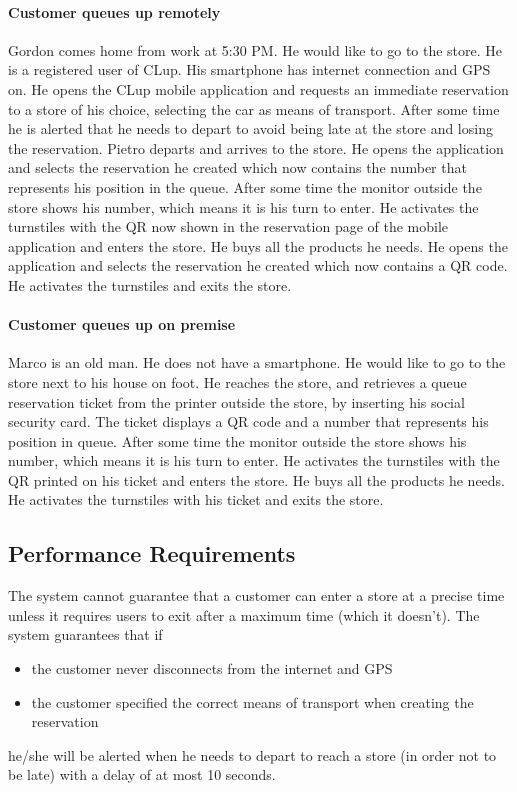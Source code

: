 \paragraph{Customer queues up remotely}
Gordon comes home from work at 5:30 PM. He would like to go to the store. He is a registered user of CLup. His smartphone has internet connection and GPS on. He opens the CLup mobile application and requests an immediate reservation to a store of his choice, selecting the car as means of transport. After some time he is alerted that he needs to depart to avoid being late at the store and losing the reservation. Pietro departs and arrives to the store. He opens the application and selects the reservation he created which now contains the number that represents his position in the queue. After some time the monitor outside the store shows his number, which means it is his turn to enter. He activates the turnstiles with the QR now shown in the reservation page of the mobile application and enters the store. He buys all the products he needs. He opens the application and selects the reservation he created which now contains a QR code. He activates the turnstiles and exits the store.
\paragraph{Customer queues up on premise}
Marco is an old man. He does not have a smartphone. He would like to go to the store next to his house on foot. He reaches the store, and retrieves a queue reservation ticket from the printer outside the store, by inserting his social security card. The ticket displays a QR code and a number that represents his position in queue. After some time the monitor outside the store shows his number, which means it is his turn to enter. He activates the turnstiles with the QR printed on his ticket and enters the store. He buys all the products he needs. He activates the turnstiles with his ticket and exits the store.
\subsection{Performance Requirements}
The system cannot guarantee that a customer can enter a store at a precise time unless it requires users to exit after a maximum time (which it doesn't).
The system guarantees that if
\begin{itemize}
	\item the customer never disconnects from the internet and GPS
	\item the customer specified the correct means of transport when creating the reservation
\end{itemize}
 he/she will be alerted when he needs to depart to reach a store (in order not to be late) with a delay of at most 10 seconds.
